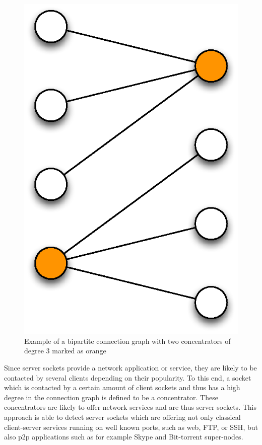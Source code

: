 \begin{figure}
	[h] \centering
	\includegraphics[width=\linewidth/3]{images/connection_graph.eps} \caption{Example of a bipartite connection graph with two concentrators of degree 3 marked as orange}
	\label{fig:bipartite_graph}
\end{figure}

Since \glspl{server socket} provide a network application or service, they are likely to be contacted by several clients depending on their popularity. To this end, a socket which is contacted by a certain amount of client sockets and thus has a high degree in the connection graph is defined to be a concentrator. These concentrators are likely to offer network services and are thus \glspl{server socket}. This approach is able to detect \glspl{server socket} which are offering not only classical client-server services running on well known ports, such as web, \gls{FTP}, or \gls{SSH}, but also \gls{p2p} applications such as for example Skype and Bit-torrent super-nodes.

